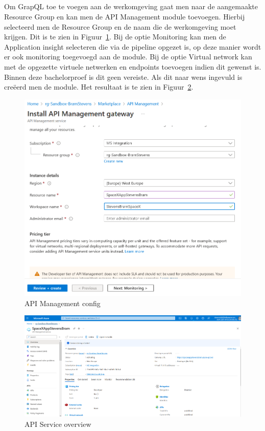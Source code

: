 \subsection{}%
\label{sec:Implementatie GraphQL}

Om GrapQL toe te voegen aan de werkomgeving gaat men naar de aangemaakte Resource Group en kan men de API Management module toevoegen.
Hierbij selecteerd men de Resource Group en de naam die de werkomgeving moet krijgen. Dit is te zien in Figuur~\ref{fig:APIM}.
Bij de optie Monitoring kan men de Application insight selecteren die via de pipeline opgezet is, op deze manier wordt er ook monitoring toegevoegd aan de module. Bij de optie Virtual network kan met de opgezette virtuele netwerken en endpoints toevoegen indien dit gewenst is. Binnen deze bachelorproef is dit geen vereiste. Als dit naar wens ingevuld is creëerd men de module. Het resultaat is te zien in Figuur~\ref{fig:APIS}.

\begin{figure}
    \centering
    \includegraphics[scale=0.60]{../img/APIManagement.png}
    \caption{\label{fig:APIM}API Management config}
\end{figure}

\begin{figure}
    \centering
    \includegraphics[scale=0.60]{../img/APIService.png}
    \caption{\label{fig:APIS}API Service overview}
\end{figure}

